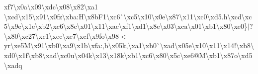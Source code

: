 xf7\textbackslash{}x0a\textbackslash{}x09\textbackslash{}xdc\textbackslash{}x08\textbackslash{}x82\textbackslash{}xa1 \textbackslash{}xcd\textbackslash{}x15\textbackslash{}x91\textbackslash{}x0fz\textbackslash{}xba\+:\+H\textbackslash{}x8b\+F1\textbackslash{}xc6\`{}\textbackslash{}xc5\textbackslash{}x10\textbackslash{}x0e\textbackslash{}x87\textbackslash{}x11\textbackslash{}xc0\textbackslash{}xd5.\+h\textbackslash{}xcd\textbackslash{}xc5\textbackslash{}x9e\textbackslash{}x1e\textbackslash{}xb2\textbackslash{}xc6\textbackslash{}x8c\textbackslash{}x01\textbackslash{}x11\textbackslash{}xac\textbackslash{}xf1\textbackslash{}xd1\textbackslash{}x8e\textbackslash{}x03\textbackslash{}xca\textbackslash{}x01\textbackslash{}xb1\textbackslash{}x80\textbackslash{}xe0\textquotesingle{}\}$\vert$?\textbackslash{}x80\textbackslash{}xc27\textbackslash{}xc1\textbackslash{}xec\textbackslash{}xe7\textbackslash{}xcf\textbackslash{}x9fo\textbackslash{}x98$<$yr\textbackslash{}xe5\+M\textbackslash{}x91\textbackslash{}xb0\textbackslash{}xa9\textbackslash{}x1b\textbackslash{}xfa\+:,b\textbackslash{}x05k,\textbackslash{}xa1\textbackslash{}xb0\`{}\textbackslash{}xad\textbackslash{}x05e\textbackslash{}x10\textbackslash{}x11\textbackslash{}x14!\textbackslash{}xb8\textbackslash{}xd0\textbackslash{}x1f\textbackslash{}xb8\textbackslash{}xad\textbackslash{}xc0u\textbackslash{}x04k\textbackslash{}x13\textbackslash{}x18k\textbackslash{}xb1\textbackslash{}xc6\textbackslash{}x80\textbackslash{}x5c\textbackslash{}xe6@\+M\textbackslash{}xb1\textbackslash{}x87o\textbackslash{}xd5\textbackslash{}xadq 